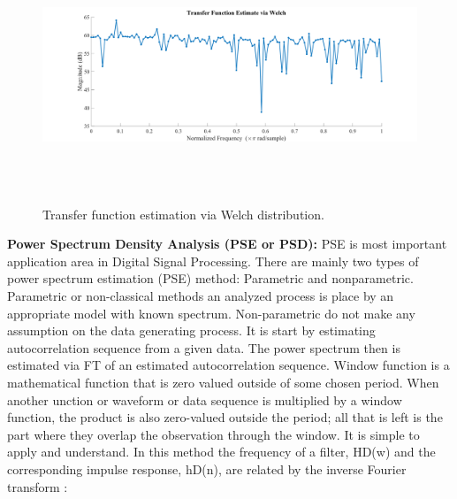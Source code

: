 \begin{figure}[H]
	\begin{Center}
		\includegraphics[width=6.5in,height=3in]{29}
		\caption{Transfer function estimation via Welch distribution.}
		\label{fig:_15_Transfer_function_estimation_via_Welch_distribution}
	\end{Center}
\end{figure}
\textbf{Power Spectrum Density Analysis (PSE or PSD):} PSE is most important application area in Digital Signal Processing. There are
mainly two types of power spectrum estimation (PSE) method: Parametric and nonparametric. Parametric or non-classical methods an analyzed process is place by an appropriate model with known spectrum. Non-parametric do not make any assumption on the data generating process. It is start by estimating autocorrelation sequence from a given data. The power spectrum then is estimated via FT of an estimated autocorrelation sequence. Window function is a mathematical function that is zero valued outside of some chosen period. When another unction or waveform or data sequence is multiplied by a window function, the product is also zero-valued outside the period; all that is left is the part where they overlap the observation through the window. It is simple to apply and understand. In this method the frequency of a filter, HD(w) and the corresponding impulse response, hD(n), are related by the inverse Fourier transform \cite{cheikhrouhou2018hybrid,khelifi2018localization,choosaksakunwiboon2018pre}:


